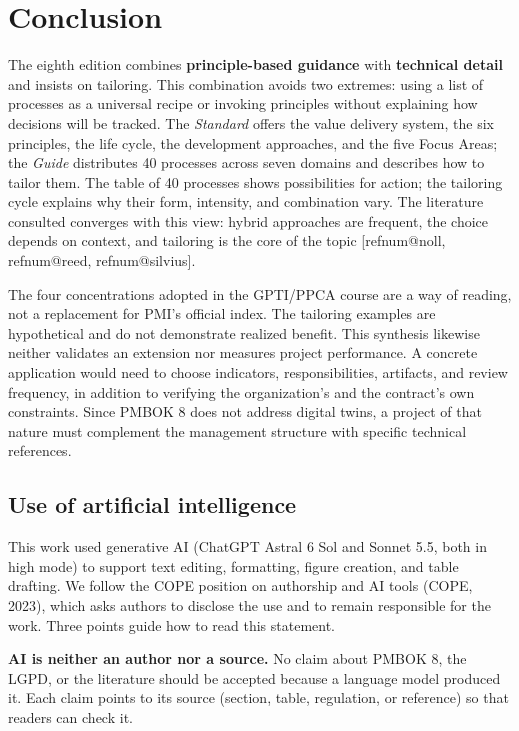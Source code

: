 \documentclass[11pt,a4paper]{article}
\makeatletter
\newif\ifavisofinal  \avisofinaltrue    %
\newcommand{\refnum}[1]{\csname refnum@#1\endcsname}
\makeatother
\begin{document}
\section{Conclusion}

The eighth edition combines \textbf{principle-based guidance} with \textbf{technical detail} and insists on tailoring. This combination avoids two extremes: using a list of processes as a universal recipe or invoking principles without explaining how decisions will be tracked. The \textit{Standard} offers the value delivery system, the six principles, the life cycle, the development approaches, and the five Focus Areas; the \textit{Guide} distributes 40 processes across seven domains and describes how to tailor them. The table of 40 processes shows possibilities for action; the tailoring cycle explains why their form, intensity, and combination vary. The literature consulted converges with this view: hybrid approaches are frequent, the choice depends on context, and tailoring is the core of the topic [\refnum{noll}, \refnum{reed}, \refnum{silvius}].

The four concentrations adopted in the GPTI/PPCA course are a way of reading, not a replacement for PMI's official index. The tailoring examples are hypothetical and do not demonstrate realized benefit. This synthesis likewise neither validates an extension nor measures project performance. A concrete application would need to choose indicators, responsibilities, artifacts, and review frequency, in addition to verifying the organization's and the contract's own constraints. Since PMBOK 8 does not address digital twins, a project of that nature must complement the management structure with specific technical references.

\ifavisofinal
\subsection{Use of artificial intelligence}

This work used generative AI (ChatGPT Astral 6 Sol and Sonnet 5.5, both in high mode) to support text editing, formatting, figure creation, and table drafting. We follow the COPE position on authorship and AI tools (COPE, 2023), which asks authors to disclose the use and to remain responsible for the work. Three points guide how to read this statement.

\textbf{AI is neither an author nor a source.} No claim about PMBOK 8, the LGPD, or the literature should be accepted because a language model produced it. Each claim points to its source (section, table, regulation, or reference) so that readers can check it.
\end{document}
